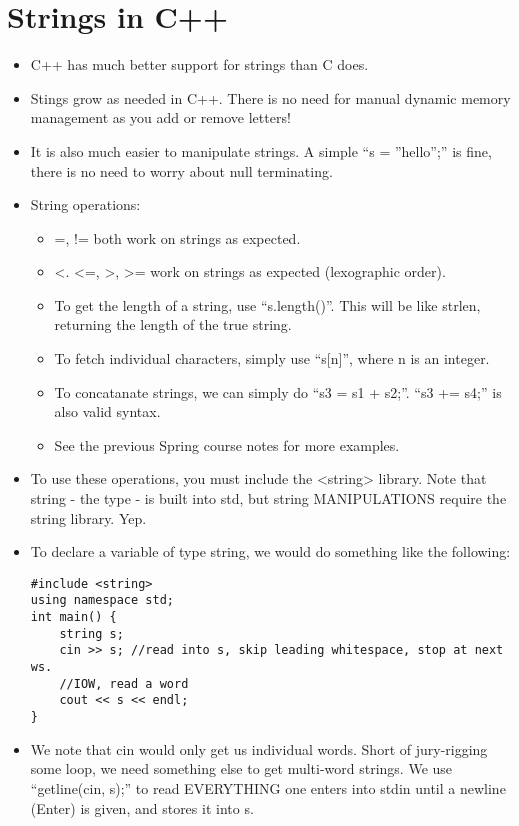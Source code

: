 \documentclass{article}
\begin{document}
\section{Strings in C++}
\begin{itemize}
\item C++ has much better support for strings than C does.
\item Stings grow as needed in C++.  There is no need for manual dynamic memory management as you add or remove letters!
\item It is also much easier to manipulate strings.  A simple ``s = ''hello'';'' is fine, there is no need to worry about null terminating. 
\item String operations:
\begin{itemize}
\item =, != both work on strings as expected.
\item <. <=, >, >= work on strings as expected (lexographic order).
\item To get the length of a string, use ``s.length()''.  This will be like strlen, returning the length of the true string.
\item To fetch individual characters, simply use ``s[n]'', where n is an integer.
\item To concatanate strings, we can simply do ``s3 = s1 + s2;''.  ``s3 += s4;'' is also valid syntax.
\item See the previous Spring course notes for more examples.
\end{itemize}
\item To use these operations, you must include the <string> library.  Note that string - the type - is built into std, but string MANIPULATIONS require the string library.  Yep.
\item To declare a variable of type string, we would do something like the following:
\begin{lstlisting}
#include <string>
using namespace std;
int main() {
    string s;
    cin >> s; //read into s, skip leading whitespace, stop at next ws.  
    //IOW, read a word
    cout << s << endl;
}
\end{lstlisting}
\item We note that cin would only get us individual words.  Short of jury-rigging some loop, we need something else to get multi-word strings.  We use ``getline(cin, s);'' to read EVERYTHING one enters into stdin until a newline (Enter) is given, and stores it into s.
\end{itemize}
\end{document}
